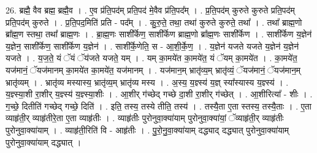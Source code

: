 \documentclass[17pt]{extarticle}
\begin{document}
26. ब्रह्मै॒ वैव ब्रह्म॒ ब्रह्मै॒व । . ए॒व प्र॑ति॒पद॑म् प्रति॒पद॑ मे॒वैव प्र॑ति॒पद᳚म् । . प्र॒ति॒पद॑म् कुरुते कुरुते प्रति॒पद॑म् प्रति॒पद॑म् कुरुते । . प्र॒ति॒पद॒मिति॑ प्रति - पद᳚म् । . कु॒रु॒ते॒ तथा॒ तथा॑ कुरुते कुरुते॒ तथा᳚ । . तथा᳚ ब्राह्म॒णो ब्रा᳚ह्म॒ण स्तथा॒ तथा᳚ ब्राह्म॒णः । . ब्रा॒ह्म॒णः साशी᳚र्केण॒ साशी᳚र्केण ब्राह्म॒णो ब्रा᳚ह्म॒णः साशी᳚र्केण । . साशी᳚र्केण य॒ज्ञेन॑ य॒ज्ञेन॒ साशी᳚र्केण॒ साशी᳚र्केण य॒ज्ञेन॑ । . साशी᳚र्के॒णेति॒ स - आ॒शी॒र्के॒ण॒ । . य॒ज्ञेन॑ यजते यजते य॒ज्ञेन॑ य॒ज्ञेन॑ यजते । . य॒ज॒ते॒ यं ॅयं ॅय॑जते यजते॒ यम् । . यम् का॒मये॑त का॒मये॑त॒ यं ॅयम् का॒मये॑त । . का॒मये॑त॒ यज॑मानं॒ ॅयज॑मानम् का॒मये॑त का॒मये॑त॒ यज॑मानम् । . यज॑मान॒म् भ्रातृ॑व्य॒म् भ्रातृ॑व्यं॒ ॅयज॑मानं॒ ॅयज॑मान॒म् भ्रातृ॑व्यम् । . भ्रातृ॑व्य मस्यास्य॒ भ्रातृ॑व्य॒म् भ्रातृ॑व्य मस्य । . अ॒स्य॒ य॒ज्ञ्स्य॑ य॒ज्ञ् स्या᳚स्यास्य य॒ज्ञ्स्य॑ । . य॒ज्ञ्स्या॒शी रा॒शीर् य॒ज्ञ्स्य॑ य॒ज्ञ्स्या॒शीः । . आ॒शीर् ग॑च्छेद् गच्छे दा॒शी रा॒शीर् ग॑च्छेत् । . आ॒शीरित्या᳚ - शीः । . ग॒च्छे॒ दितीति॑ गच्छेद् गच्छे॒ दिति॑ । . इति॒ तस्य॒ तस्ये तीति॒ तस्य॑ । . तस्यै॒ता ए॒ता स्तस्य॒ तस्यै॒ताः । . ए॒ता व्याहृ॑ती॒र् व्याहृ॑तीरे॒ता ए॒ता व्याहृ॑तीः । . व्याहृ॑तीः पुरोनुवा॒क्या॑याम् पुरोनुवा॒क्या॑यां॒ ॅव्याहृ॑ती॒र् व्याहृ॑तीः पुरोनुवा॒क्या॑याम् । . व्याहृ॑ती॒रिति॑ वि - आहृ॑तीः । . पु॒रो॒नु॒वा॒क्या॑याम् दद्ध्याद् दद्ध्यात् पुरोनुवा॒क्या॑याम् पुरोनुवा॒क्या॑याम् दद्ध्यात् । \newline
\end{document}

